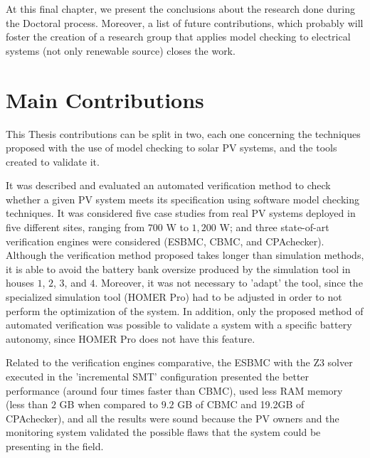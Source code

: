 At this final chapter, we present the conclusions about the research done during the Doctoral process. Moreover, a list of future contributions, which probably will foster the creation of a research group that applies model checking to electrical systems (not only renewable source) closes the work.

\section{Main Contributions}

This Thesis contributions can be split in two, each one concerning the techniques proposed with the use of model checking to solar PV systems, and the tools created to validate it.

It was described and evaluated an automated verification method to check whether a given PV system meets its specification using software model checking techniques. It was considered five case studies from real PV systems deployed in five different sites, ranging from $700$ W to $1,200$ W; and three state-of-art verification engines were considered (ESBMC, CBMC, and CPAchecker). Although the verification method proposed takes longer than simulation methods, it is able to avoid the battery bank oversize produced by the simulation tool in houses $1$, $2$, $3$, and $4$. Moreover, it was not necessary to 'adapt' the tool, since the specialized simulation tool (HOMER Pro) had to be adjusted in order to not perform the optimization of the system. In addition, only the proposed method of automated verification was possible to validate a system with a specific battery autonomy, since HOMER Pro does not have this feature.

Related to the verification engines comparative, the ESBMC with the Z3 solver executed in the 'incremental SMT' configuration presented the better performance (around four times faster than CBMC), used less RAM memory (less than $2$ GB when compared to $9.2$ GB of CBMC and 19.2GB of CPAchecker), and all the results were sound because the PV owners and the monitoring system validated the possible flaws that the system could be presenting in the field.

